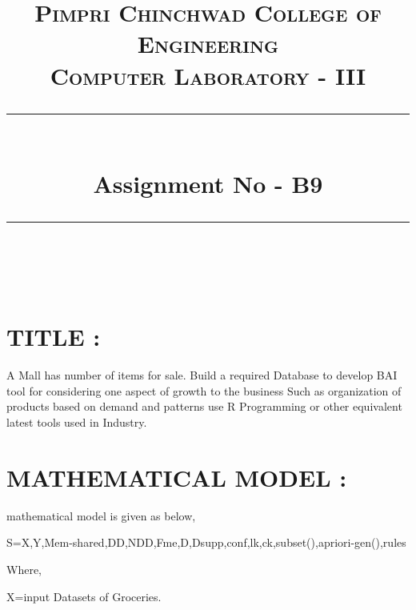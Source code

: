 \documentclass[a4paper,12pt]{article}
\title{
	\normalfont \normalsize 
	\textsc{Pimpri Chinchwad College of Engineering \\ 
		Computer Laboratory - III} \\
	[10pt] 
	\rule{\linewidth}{0.5pt} \\[6pt] 
	\huge Assignment No - B9 \\
	\rule{\linewidth}{2pt}  \\[10pt]
}
\author{}
\date{\normalsize}
\newenvironment{codefont}{\fontfamily{ccr}\selectfont}{\par}
\begin{document}
	\maketitle
	


\section{TITLE : }   A Mall has number of items for sale. Build a required Database to develop BAI tool for considering one aspect of growth to the business Such as organization of products based on demand and patterns use R Programming or other equivalent latest tools used in Industry.

\section{MATHEMATICAL MODEL : }

{\rmfamily
	mathematical model is given as below,}


\bigskip

\textrm{S=X,Y,Mem-shared,DD,NDD,Fme,D,Dsupp,conf,lk,ck,subset(),apriori-gen(),rules}


\bigskip

{\rmfamily
	Where,}

{\rmfamily
	X=input
	Datasets of Groceries.
	}
\end{document}
